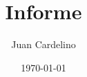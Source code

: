 \documentclass[11pt]{report}
\title{Informe}
\author{Juan Cardelino}
\date{\today}
\begin{document}
\tableofcontents
\pagebreak
\renewcommand{\imdir}{images/img9}
\renewcommand{\figDir}{images/img9}

\cleardoublepage
%
%

 



\end{document}
